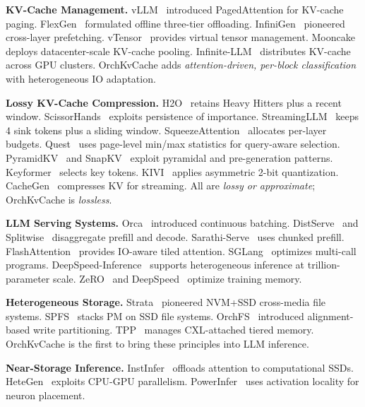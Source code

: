 \documentclass[conference]{IEEEtran}
\begin{document}
\textbf{KV-Cache Management.} vLLM~\cite{vllm} introduced PagedAttention for KV-cache paging. FlexGen~\cite{flexgen} formulated offline three-tier offloading. InfiniGen~\cite{infinigen} pioneered cross-layer prefetching. vTensor~\cite{vtensor} provides virtual tensor management. Mooncake~\cite{mooncake} deploys datacenter-scale KV-cache pooling. Infinite-LLM~\cite{infinitellm} distributes KV-cache across GPU clusters. OrchKvCache adds \emph{attention-driven, per-block classification} with heterogeneous IO adaptation.

\textbf{Lossy KV-Cache Compression.} H2O~\cite{h2o} retains Heavy Hitters plus a recent window. ScissorHands~\cite{scissorhands} exploits persistence of importance. StreamingLLM~\cite{streamingllm} keeps 4 sink tokens plus a sliding window. SqueezeAttention~\cite{squeezeattention} allocates per-layer budgets. Quest~\cite{quest} uses page-level min/max statistics for query-aware selection. PyramidKV~\cite{pyramidkv} and SnapKV~\cite{snapkv} exploit pyramidal and pre-generation patterns. Keyformer~\cite{keyformer} selects key tokens. KIVI~\cite{kivi} applies asymmetric 2-bit quantization. CacheGen~\cite{cachegen} compresses KV for streaming. All are \emph{lossy or approximate}; OrchKvCache is \emph{lossless}.

\textbf{LLM Serving Systems.} Orca~\cite{orca} introduced continuous batching. DistServe~\cite{distserve} and Splitwise~\cite{splitwise} disaggregate prefill and decode. Sarathi-Serve~\cite{sarathi} uses chunked prefill. FlashAttention~\cite{flashattn,flashattn2} provides IO-aware tiled attention. SGLang~\cite{sglang} optimizes multi-call programs. DeepSpeed-Inference~\cite{deepspeed-inf} supports heterogeneous inference at trillion-parameter scale. ZeRO~\cite{zero} and DeepSpeed~\cite{deepspeed} optimize training memory.

\textbf{Heterogeneous Storage.} Strata~\cite{strata} pioneered NVM+SSD cross-media file systems. SPFS~\cite{spfs} stacks PM on SSD file systems. OrchFS~\cite{orchfs} introduced alignment-based write partitioning. TPP~\cite{tpp} manages CXL-attached tiered memory. OrchKvCache is the first to bring these principles into LLM inference.

\textbf{Near-Storage Inference.} InstInfer~\cite{instinfer} offloads attention to computational SSDs. HeteGen~\cite{hetegen} exploits CPU-GPU parallelism. PowerInfer~\cite{powerinfer} uses activation locality for neuron placement.

\end{document}
